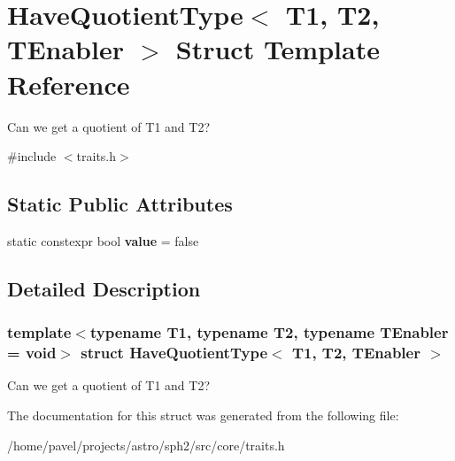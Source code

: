 \hypertarget{structHaveQuotientType}{}\section{Have\+Quotient\+Type$<$ T1, T2, T\+Enabler $>$ Struct Template Reference}
\label{structHaveQuotientType}


Can we get a quotient of T1 and T2?  




{\ttfamily \#include $<$traits.\+h$>$}

\subsection*{Static Public Attributes}
\begin{DoxyCompactItemize}
\item 
\hypertarget{structHaveQuotientType_a917fa243ceba0032a068475024dcc7be}{}\label{structHaveQuotientType_a917fa243ceba0032a068475024dcc7be} 
static constexpr bool {\bfseries value} = false
\end{DoxyCompactItemize}


\subsection{Detailed Description}
\subsubsection*{template$<$typename T1, typename T2, typename T\+Enabler = void$>$\newline
struct Have\+Quotient\+Type$<$ T1, T2, T\+Enabler $>$}

Can we get a quotient of T1 and T2? 

The documentation for this struct was generated from the following file\+:\begin{DoxyCompactItemize}
\item 
/home/pavel/projects/astro/sph2/src/core/traits.\+h\end{DoxyCompactItemize}
